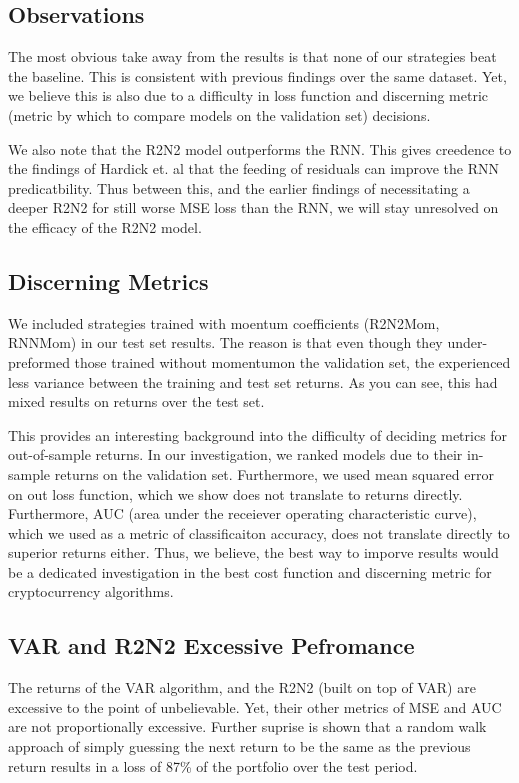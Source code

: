 \subsection{Observations}
The most obvious take away from the results is that none of our strategies beat the baseline. This is consistent with previous findings over the same dataset. \cite{ian} Yet, we believe this is also due to a difficulty in loss function and discerning metric (metric by which to compare models on the validation set) decisions. 

We also note that the R2N2 model outperforms the RNN. This gives creedence to the findings of Hardick et. al that the feeding of residuals can improve the RNN predicatbility. Thus between this, and the earlier findings of necessitating a deeper R2N2 for still worse MSE loss than the RNN, we will stay unresolved on the efficacy of the R2N2 model. 

\subsection{Discerning Metrics}

We included strategies trained with moentum coefficients (R2N2Mom, RNNMom) in our test set results. The reason is that even though they under-preformed those trained without momentumon the validation set, the experienced less variance between the training and test set returns. As you can see, this had mixed results on returns over the test set. 

This provides an interesting background into the difficulty of deciding metrics for out-of-sample returns. In our investigation, we ranked models due to their in-sample returns on the validation set. Furthermore, we used mean squared error on out loss function, which we show does not translate to returns directly. Furthermore, AUC (area under the receiever operating characteristic curve), which we used as a metric of classificaiton accuracy, does not translate directly to superior returns either. Thus, we believe, the best way to imporve results would be a dedicated investigation in the best cost function and discerning metric for cryptocurrency algorithms. 

\subsection{VAR and R2N2 Excessive Pefromance}

The returns of the VAR algorithm, and the R2N2 (built on top of VAR) are excessive to the point of unbelievable. Yet, their other metrics of MSE and AUC are not proportionally excessive. Further suprise is shown that a random walk approach of simply guessing the next return to be the same as the previous return results in a loss of 87\% of the portfolio over the test period. 